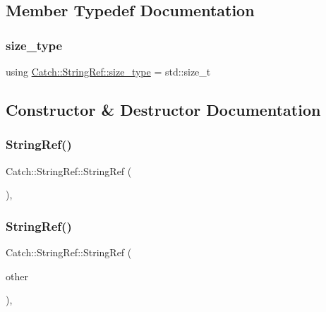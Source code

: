 \subsection{Member Typedef Documentation}
\mbox{\label{class_catch_1_1_string_ref_a06b4db8fc82b197004291cf370b2ba7c}} 
\subsubsection{\texorpdfstring{size\_type}{size\_type}}
{\footnotesize\ttfamily using \mbox{\hyperlink{class_catch_1_1_string_ref_a06b4db8fc82b197004291cf370b2ba7c}{Catch\+::\+String\+Ref\+::size\+\_\+type}} =  std\+::size\+\_\+t}



\subsection{Constructor \& Destructor Documentation}
\mbox{\label{class_catch_1_1_string_ref_a94319c75df6542327c93a312c6a80754}} 
\subsubsection{\texorpdfstring{StringRef()}{StringRef()}\hspace{0.1cm}{\footnotesize\ttfamily [1/6]}}
{\footnotesize\ttfamily Catch\+::\+String\+Ref\+::\+String\+Ref (\begin{DoxyParamCaption}{ }\end{DoxyParamCaption})\hspace{0.3cm}{\ttfamily [inline]}, {\ttfamily [noexcept]}}

\mbox{\label{class_catch_1_1_string_ref_a2f287267c3a988b288bfd910667c1cfc}} 
\subsubsection{\texorpdfstring{StringRef()}{StringRef()}\hspace{0.1cm}{\footnotesize\ttfamily [2/6]}}
{\footnotesize\ttfamily Catch\+::\+String\+Ref\+::\+String\+Ref (\begin{DoxyParamCaption}\item[{\mbox{\hyperlink{class_catch_1_1_string_ref}{String\+Ref}} const \&}]{other }\end{DoxyParamCaption})\hspace{0.3cm}{\ttfamily [inline]}, {\ttfamily [noexcept]}}

